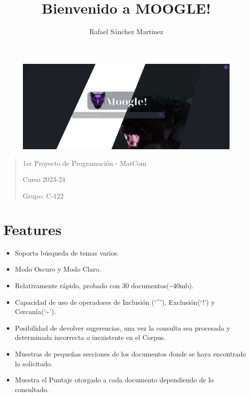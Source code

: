 \documentclass{article}
\begin{document}
\title{Bienvenido a MOOGLE!}
\author{Rafael Sánchez Martinez}
\maketitle

\begin{figure}[h]
    \includegraphics[width=470px]{Assets/moogle.png}
\end{figure}

\begin{quote}
1er Proyecto de Programación - MatCom

Curso 2023-24

Grupo: C-122
\end{quote}

\section*{Features}\label{sec:ent}
\begin{itemize}
    \item
  Soporta búsqueda de temas varios.
    \item
  Modo Oscuro y Modo Claro.
    \item
  Relativamente rápido, probado con 30 documentos(\textasciitilde40mb).
    \item
  Capacidad de uso de operadores de Inclusión (`\^{}'), Exclusión(`!') y
  Cercanía(`\textasciitilde{}').
    \item
  Posibilidad de devolver sugerencias, una vez la consulta sea procesada
  y determinada incorrecta o inexistente en el Corpus.
    \item
  Muestras de pequeñas secciones de los documentos donde se haya
  encontrado lo solicitado.
    \item
  Muestra el Puntaje otorgado a cada documento dependiendo de lo
  consultado.
\end{itemize}
\end{document}
